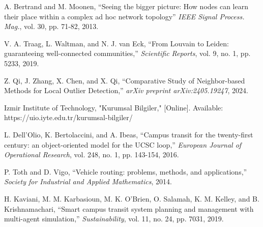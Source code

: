 \documentclass[12pt,twoside,a4paper,fleqn,bibliography=totocnumbered]{report}
\begin{document}

\setcounter{page}{1}
\cleardoublepage

\tableofcontents
\cleardoublepage
{}
\setcounter{page}{1}








\cleardoublepage
{}
%
%    	             

\begin{thebibliography}{1}

 A. Bertrand and M. Moonen, ``Seeing the bigger picture: How nodes can learn their place within a complex ad hoc network topology'' \emph{IEEE Signal Process. Mag.}, vol. 30, pp. 71-82, 2013.

 V. A. Traag, L. Waltman, and N. J. van Eck, ``From Louvain to Leiden: guaranteeing well-connected communities,'' \emph{Scientific Reports}, vol. 9, no. 1, pp. 5233, 2019.

 Z. Qi, J. Zhang, X. Chen, and X. Qi, ``Comparative Study of Neighbor-based Methods for Local Outlier Detection,'' \emph{arXiv preprint arXiv:2405.19247}, 2024.

 Izmir Institute of Technology, "Kurumsal Bilgiler," [Online]. Available: https://uio.iyte.edu.tr/kurumsal-bilgiler/

 L. Dell'Olio, K. Bertolaccini, and A. Ibeas, ``Campus transit for the twenty-first century: an object-oriented model for the UCSC loop,'' \emph{European Journal of Operational Research}, vol. 248, no. 1, pp. 143-154, 2016.

 P. Toth and D. Vigo, ``Vehicle routing: problems, methods, and applications,'' \emph{Society for Industrial and Applied Mathematics}, 2014.

 H. Kaviani, M. M. Karbasioun, M. K. O'Brien, O. Salamah, K. M. Kelley, and B. Krishnamachari, ``Smart campus transit system planning and management with multi-agent simulation,'' \emph{Sustainability}, vol. 11, no. 24, pp. 7031, 2019.


\end{thebibliography}
\end{document}
